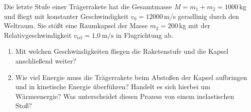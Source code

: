 \begin{ExerciseBlock}
Die letzte Stufe einer Trägerrakete hat die Gesamtmasse $M = m_1 + m_2 = 1000\,$kg und fliegt mit konstanter Geschwindigkeit $v_0 = 12000\,$m/s geradlinig durch den Weltraum. Sie stößt eine Raumkapsel der Masse $m_2 = 200\,$kg mit der Relativgeschwindigkeit $v_\mathrm{rel}=\qty{1.0}{\metre\per\second}$ in Flugrichtung ab.

\begin{center}
\end{center}

\begin{enumerate}
	\item Mit welchen Geschwindigkeiten fliegen die Raketenstufe und die Kapsel anschließend weiter?

	\item Wie viel Energie muss die Trägerrakete beim Abstoßen der Kapsel aufbringen und in kinetische Energie überführen? Handelt es sich hierbei um Wärmeenergie? Was unterscheidet diesen Prozess von einem inelastischen Stoß?
\end{enumerate}
\end{ExerciseBlock}
